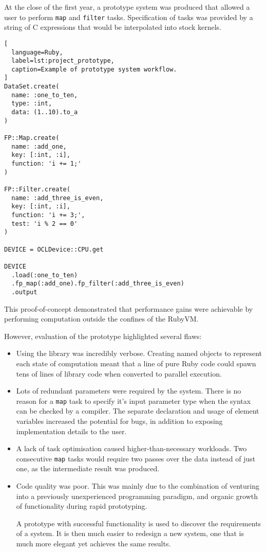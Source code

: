 At the close of the first year, a prototype system was produced that allowed a user to perform \verb|map| and \verb|filter| tasks.
Specification of tasks was provided by a string of C expressions that would be interpolated into stock kernels.
\begin{lstlisting}[
  language=Ruby,
  label=lst:project_prototype,
  caption=Example of prototype system workflow.
]
DataSet.create(
  name: :one_to_ten,
  type: :int,
  data: (1..10).to_a
)

FP::Map.create(
  name: :add_one,
  key: [:int, :i],
  function: 'i += 1;'
)

FP::Filter.create(
  name: :add_three_is_even,
  key: [:int, :i],
  function: 'i += 3;',
  test: 'i % 2 == 0'
)

DEVICE = OCLDevice::CPU.get

DEVICE
  .load(:one_to_ten)
  .fp_map(:add_one).fp_filter(:add_three_is_even)
  .output
\end{lstlisting}
This proof-of-concept demonstrated that performance gains were achievable by performing computation outside the confines of the \ac{RubyVM}.

However, evaluation of the prototype highlighted several flaws:
\begin{itemize}
    \item Using the library was incredibly verbose. Creating named objects to represent each state of computation meant that a line of pure Ruby code could spawn tens of lines of library code when converted to parallel execution.

    \item Lots of redundant parameters were required by the system. There is no reason for a \verb|map| task to specify it's input parameter type when the syntax can be checked by a compiler. The separate declaration and usage of element variables increased the potential for bugs, in addition to exposing implementation details to the user.

    \item A lack of task optimisation caused higher-than-necessary workloads. Two consecutive \verb|map| tasks would require two passes over the data instead of just one, as the intermediate result was produced.

    \item Code quality was poor. This was mainly due to the combination of venturing into a previously unexperienced programming paradigm, and organic growth of functionality during rapid prototyping.

    A prototype with successful functionality is used to discover the requirements of a system. It is then much easier to redesign a new system, one that is much more elegant yet achieves the same results.
\end{itemize}

